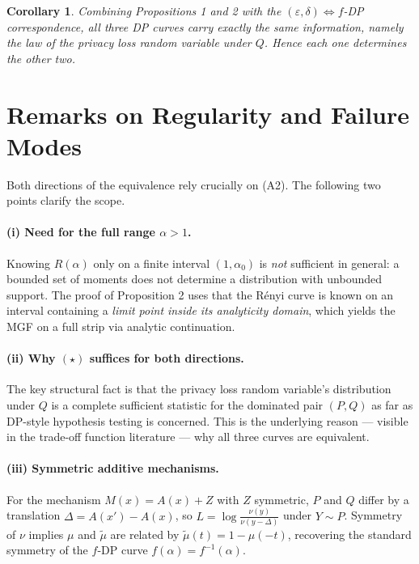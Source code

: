 \documentclass[11pt]{article}
\newtheorem{corollary}{Corollary}
\begin{document}
\begin{corollary}
Combining Propositions 1 and 2 with the $(\varepsilon,\delta) \Leftrightarrow f$-DP correspondence, all three DP curves carry exactly the same information, namely the law of the privacy loss random variable under $Q$. Hence each one determines the other two.
\end{corollary}

\section{Remarks on Regularity and Failure Modes}

Both directions of the equivalence rely crucially on (A2). The following two points clarify the scope.

\paragraph{(i) Need for the full range $\alpha > 1$.} Knowing $R(\alpha)$ only on a finite interval $(1,\alpha_0)$ is \emph{not} sufficient in general: a bounded set of moments does not determine a distribution with unbounded support. The proof of Proposition 2 uses that the R\'enyi curve is known on an interval containing a \emph{limit point inside its analyticity domain}, which yields the MGF on a full strip via analytic continuation.

\paragraph{(ii) Why $(\star)$ suffices for both directions.} The key structural fact is that the privacy loss random variable's distribution under $Q$ is a complete sufficient statistic for the dominated pair $(P,Q)$ as far as DP-style hypothesis testing is concerned. This is the underlying reason --- visible in the trade-off function literature --- why all three curves are equivalent.

\paragraph{(iii) Symmetric additive mechanisms.} For the mechanism $M(x) = A(x) + Z$ with $Z$ symmetric, $P$ and $Q$ differ by a translation $\Delta = A(x') - A(x)$, so $L = \log\frac{\nu(y)}{\nu(y-\Delta)}$ under $Y \sim P$. Symmetry of $\nu$ implies $\mu$ and $\tilde\mu$ are related by $\tilde\mu(t) = 1 - \mu(-t)$, recovering the standard symmetry of the $f$-DP curve $f(\alpha) = f^{-1}(\alpha)$.
\end{document}
